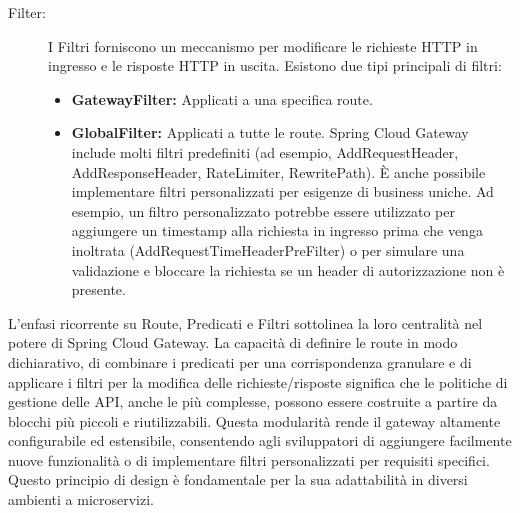 \begin{description}
    \item[Filter:] I Filtri forniscono un meccanismo per modificare le richieste HTTP in ingresso e le risposte HTTP in uscita. Esistono due tipi principali di filtri:
    \begin{itemize}
        \item \textbf{GatewayFilter:} Applicati a una specifica route.
        \item \textbf{GlobalFilter:} Applicati a tutte le route. Spring Cloud Gateway include molti filtri predefiniti (ad esempio, AddRequestHeader, AddResponseHeader, RateLimiter, RewritePath). È anche possibile implementare filtri personalizzati per esigenze di business uniche. Ad esempio, un filtro personalizzato potrebbe essere utilizzato per aggiungere un timestamp alla richiesta in ingresso prima che venga inoltrata (AddRequestTimeHeaderPreFilter) o per simulare una validazione e bloccare la richiesta se un header di autorizzazione non è presente.
    \end{itemize}
\end{description}

L'enfasi ricorrente su Route, Predicati e Filtri sottolinea la loro centralità nel potere di Spring Cloud Gateway. 
La capacità di definire le route in modo dichiarativo, di combinare i predicati per una corrispondenza granulare e di applicare i filtri per la modifica delle richieste/risposte significa che le politiche di gestione delle API, anche le più complesse, possono essere costruite a partire da blocchi più piccoli e riutilizzabili. 
Questa modularità rende il gateway altamente configurabile ed estensibile, consentendo agli sviluppatori di aggiungere facilmente nuove funzionalità o di implementare filtri personalizzati per requisiti specifici. 
Questo principio di design è fondamentale per la sua adattabilità in diversi ambienti a microservizi.


